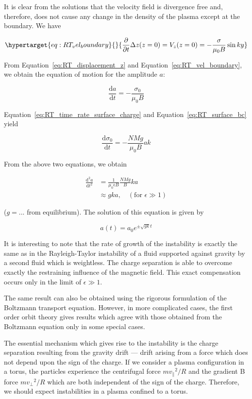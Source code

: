 \documentclass[
  notoc %
]{tufte-book}
\begin{document}
It is clear from the solutions that the velocity field is divergence
free and, therefore, does not cause any change in the density of the
plasma except at the boundary. We have

\begin{equation}\protect\hypertarget{eq:RT_vel_boundary}{}{
\frac{\partial}{\partial t}\Delta z(z=0)=V_z(z=0) = -\frac{\sigma}{\mu_0 B}\sin ky
}\label{eq:RT_vel_boundary}\end{equation}

From Equation~\ref{eq:RT_displacement_z} and
Equation~\ref{eq:RT_vel_boundary}, we obtain the equation of motion for
the amplitude \(a\):

\[
\frac{\mathrm{d}a}{\mathrm{d}t}=-\frac{\sigma_0}{\mu_0 B}
\]

Equation~\ref{eq:RT_time_rate_surface_charge} and
Equation~\ref{eq:RT_surface_bc} yield

\[
\frac{\mathrm{d}\sigma_0}{\mathrm{d}t}=-\frac{NMg}{\mu_0B}ak
\]

From the above two equations, we obtain

\[
\begin{aligned}
\frac{\mathrm{d}^2 a}{\mathrm{d}t^2} &= \frac{1}{\mu_0\epsilon B}\frac{NMg}{B}ka \\
&\approx gka, \quad(\text{for } \epsilon \gg 1)
\end{aligned}
\]

(\(g=...\) from equilibrium). The solution of this equation is given by

\[
a(t) = a_0e^{\pm\sqrt{gk} t}
\]

It is interesting to note that the rate of growth of the instability is
exactly the same as in the Rayleigh-Taylor instability of a fluid
supported against gravity by a second fluid which is weightless. The
charge separation is able to overcome exactly the restraining influence
of the magnetic field. This exact compensation occurs only in the limit
of \(\epsilon\gg1\).

The same result can also be obtained using the rigorous formulation of
the Boltzmann transport equation. However, in more complicated cases,
the first order orbit theory gives results which agree with those
obtained from the Boltzmann equation only in some special cases.

The essential mechanism which gives rise to the instability is the
charge separation resulting from the gravity drift --- drift arising
from a force which does not depend upon the sign of the charge. If we
consider a plasma configuration in a torus, the particles experience the
centrifugal force \(m{v_\parallel}^2/R\) and the gradient B force
\(m{v_\perp}^2/R\) which are both independent of the sign of the charge.
Therefore, we should expect instabilities in a plasma confined to a
torus.
\end{document}
